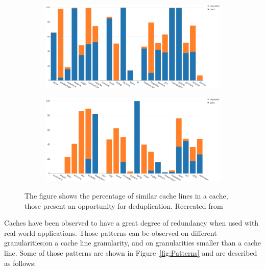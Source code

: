 \begin{figure}
    \begin{subfigure}[t]{\textwidth}
        \includegraphics[width=\textwidth]{DedupPotential1.png}
    \end{subfigure}
    \begin{subfigure}[b]{\textwidth}
        \includegraphics[width=\textwidth]{DedupPotential2.png}
    \end{subfigure}
    \caption[Inter-line Patterns]{The figure shows the percentage of similar cache lines in a cache, those present an opportunity for deduplication. Recreated from \protect\cite{dedup}}
    \label{fig:DedupPotential}
\end{figure}
Caches have been observed to have a great degree of redundancy when used with real world applications. Those patterns can be observed on different granularities;on a cache line granularity, and on granularities smaller than a cache line. Some of those patterns are shown in Figure~\ref{fig:Patterns} and are described as follows:
